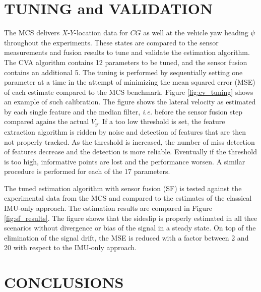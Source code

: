 \documentclass[letterpaper, 10 pt, conference]{ieeeconf}
\begin{document}
\section{TUNING and VALIDATION }\label{sec:validation}

The MCS delivers $X$-$Y$-location data for $CG$ as well at the vehicle yaw heading $\psi$ throughout the experiments. These states are compared to the sensor measurements and fusion results to tune and validate the estimation algorithm. The CVA algorithm contains 12 parameters to be tuned, and the sensor fusion contains an additional 5. The tuning is performed by sequentially setting one parameter at a time in the attempt of minimizing the mean squared error (MSE) of each estimate compared to the MCS benchmark.   Figure \ref{fig:cv_tuning} shows an example of such calibration. The figure shows the lateral velocity as estimated by each single feature and the median filter, \emph{i.e.} before the sensor fusion step compared agains the actual $V_y$.
If a too low threshold is set, the feature extraction algorithm is ridden by noise and detection of features that are then not properly tracked. As the threshold is increased, the number of miss detection of features decrease and the detection is more reliable. Eventually if the threshold is too high, informative points are lost and the performance worsen.  A similar procedure is performed for each of the 17 parameters.

The tuned estimation algorithm with sensor fusion (SF) is tested against the experimental data from the MCS and compared to the estimates of the classical IMU-only approach. The estimation results are compared in  Figure \ref{fig:sf_results}. The figure shows that the sideslip is properly estimated in all thee scenarios without   divergence or bias of the signal in a steady state. On top of the elimination of the signal drift, the MSE is reduced with a factor between 2 and 20 with respect to the IMU-only approach.


\section{CONCLUSIONS}
\end{document}
